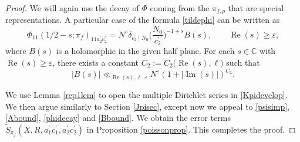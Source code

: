 \documentclass[12pt,reqno]{amsart}
\theoremstyle{plain}
\theoremstyle{remark}
\renewcommand{\Im}{\operatorname{Im}}
\renewcommand{\Re}{\operatorname{Re}}
\numberwithin{equation}{section}
\numberwithin{lemma}{section}
\numberwithin{theorem}{section}
\numberwithin{prop}{section}
\numberwithin{remark}{section}
\begin{document}
\begin{proof}
We will again use the decay of $\Phi$ coming from the $\pi_{f,p}$ that
are special representations. 
A particular case of the formula \eqref{tildephi} can be written as
\begin{equation} \label{phidecay} 
\Phi_{11}(1/2-s;\pi_f)_{11a_2^{\prime} c_2^{\prime}}= 
N^{s} \delta_{c_2^{\prime} \mid N_0} 
\Big( \frac{N_0}{c_2^{\prime}} \Big)^{-1+s} B(s), \qquad \Re(s) \geq \varepsilon,
\end{equation}
where $B(s)$ is a holomorphic in the given half plane. 
For each $s \in \mathbb{C}$ with $\Re(s) \geq \varepsilon$, 
there exists a constant $C_2:=C_2 \big({\Re(s),\ell} \big)$
such that
\begin{equation} \label{Bbound}
|B(s)| \ll_{\Re(s),\ell,\varepsilon} 
N^{\varepsilon} (1+|\Im(s)|)^{C_2}.
\end{equation}

We use Lemma \ref{rep1lem} to open the multiple Dirichlet series in \eqref{Kpidevelop}.
We then argue similarly to Section \ref{Jpisec}, except now we appeal to
\eqref{psisimp}, \eqref{Abound}, \eqref{phidecay} and \eqref{Bbound}. 
We obtain the error terms $\widetilde{S}_{\pi_f}(X,R,a_1^{\prime} c_1^{\prime}, a_2^{\prime} c_2^{\prime} )$ in 
Proposition \ref{poissonprop}. 
This completes the proof.
\end{proof} 
\end{document}
